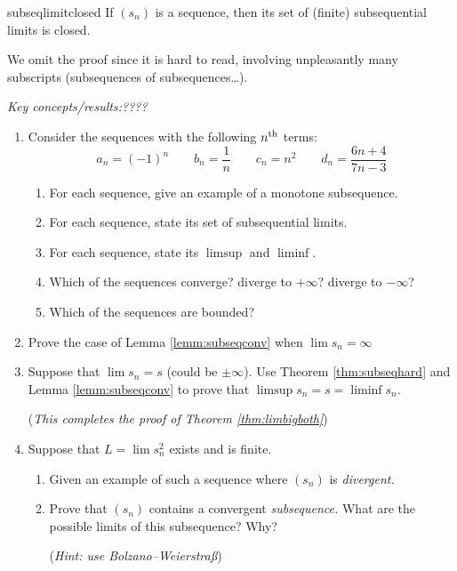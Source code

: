 \begin{thm}{}{subseqlimitclosed}
If $(s_n)$ is a sequence, then its set of (finite) subsequential limits is closed.
\end{thm}

We omit the proof since it is hard to read, involving unpleasantly many subscripts (subsequences of subsequences\ldots). %


\goodbreak


\begin{exercises}{}{}
	\emph{Key concepts/results:\quad ????}
	
	\begin{enumerate}
	  \item%
	  Consider the sequences with the following $n\textsuperscript{th}$ terms:
		\[
			a_n=(-1)^n\qquad b_n=\frac 1n\qquad c_n=n^2\qquad d_n=\frac{6n+4}{7n-3}
		\]
		\begin{enumerate}
		  \item For each sequence, give an example of a monotone subsequence.
		  \item For each sequence, state its set of subsequential limits.
		  \item For each sequence, state its $\limsup$ and $\liminf$.
		  \item Which of the sequences converge? diverge to $+\infty$? diverge to $-\infty$?
		  \item Which of the sequences are bounded?
	  \end{enumerate}
  
  
  	\item Prove the case of Lemma \ref{lemm:subseqconv} when $\lim s_n=\infty$
  

		\item\label{exs:liminfsuplim} Suppose that $\lim s_n=s$ (could be $\pm \infty$). Use Theorem \ref{thm:subseqhard} and Lemma \ref{lemm:subseqconv} to prove that $\limsup s_n=s=\liminf s_n$.\par
		(\emph{This completes the proof of Theorem \ref{thm:limbigboth}})
	
  
		\item Suppose that $L=\lim s_n^2$ exists and is finite.
		\begin{enumerate}
		  \item Given an example of such a sequence where $(s_n)$ is \emph{divergent.}
		  \item Prove that $(s_n)$ contains a convergent \emph{subsequence.} What are the possible limits of this subsequence? Why?\par
		(\emph{Hint: use Bolzano--Weierstraß})
		\end{enumerate}
		

\end{enumerate}
\end{exercises}
